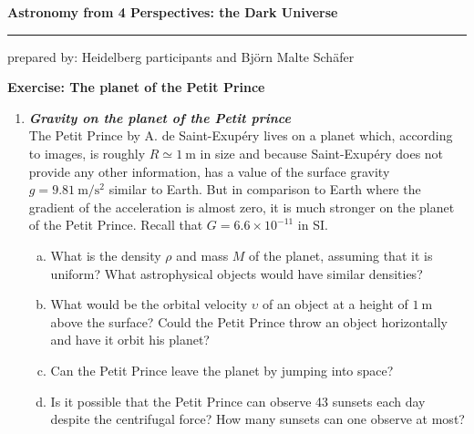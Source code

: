 \documentclass[a4paper,12pt]{article}
\newcommand{\question}[1]{\textbf{\textit{#1}}}
\newcommand{\HRule}{\rule{\linewidth}{0.3mm}}
\begin{document}
\pagestyle{empty}

\begin{center}
\LARGE \textbf{Astronomy from 4 Perspectives: the Dark Universe}
\HRule
\end{center}
\begin{flushright}
prepared by: Heidelberg participants and Bj{\"o}rn Malte Sch{\"a}fer
\end{flushright}
\begin{center}
{\Large \textbf{Exercise: The planet of the Petit Prince}}
\end{center}
\vspace{5mm}

\begin{enumerate}

\item \question{Gravity on the planet of the Petit prince}\\
The Petit Prince by A. de Saint-Exup{\'e}ry lives on a planet which,
according to images, is roughly $R\simeq 1~\mathrm{m}$ in size and
because Saint-Exup{\'e}ry does not provide any other information, has a
value of the surface gravity $g=9.81~\mathrm{m}/\mathrm{s}^2$ similar
to Earth. But in comparison to Earth where the gradient of the
acceleration is almost zero, it is much stronger on the planet of the
Petit Prince. Recall that $G=6.6\times 10^{-11}$ in SI.
\begin{enumerate}[(a)]
\item{What is the density $\rho$ and mass $M$ of the planet, assuming that it is uniform? What astrophysical objects would have similar densities?}
\item{What would be the orbital velocity $\upsilon$ of an object at a height of $1~\mathrm{m}$ above the surface? Could the Petit Prince throw an object horizontally and have it orbit his planet?}
\item{Can the Petit Prince leave the planet by jumping into space?}
\item{Is it possible that the Petit Prince can observe 43 sunsets each day despite the centrifugal force? How many sunsets can one observe at most?}
\end{enumerate}


\end{enumerate}
\end{document}
